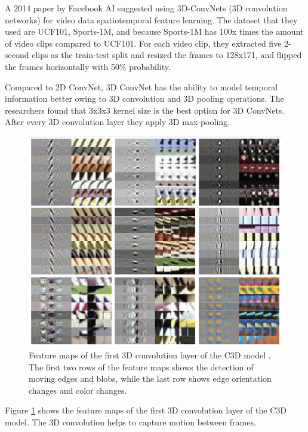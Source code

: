 A 2014 paper \cite{tran2015learning} by Facebook AI suggested using 3D-ConvNets (3D convolution networks) for video data spatiotemporal feature learning. The dataset that they used are UCF101, Sports-1M, and because Sports-1M has 100x times the amount of video clips compared to UCF101. For each video clip, they extracted five 2-second clips as the train-test split and resized the frames to 128x171, and flipped the frames horizontally with 50\% probability.

Compared to 2D ConvNet, 3D ConvNet has the ability to model temporal information better owing to 3D convolution and 3D pooling operations. The researchers found that 3x3x3 kernel size is the best option for 3D ConvNets. After every 3D convolution layer they apply 3D max-pooling.

\begin{figure}
    \centering
    \includegraphics[width=1\textwidth]{images/video_synthesis/c3d_feature_maps.png}
    \caption{Feature maps of the first 3D convolution layer of the C3D model \cite{tran2015learning}. The first two rows of the feature maps shows the detection of moving edges and blobs, while the last row shows edge orientation changes and color changes.}
    \label{fig:c3d_feature_maps}
\end{figure}

Figure \ref{fig:c3d_feature_maps} shows the feature maps of the first 3D convolution layer of the C3D model. The 3D convolution helps to capture motion between frames.

